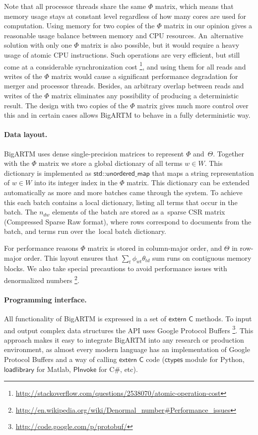 \documentclass[russian,english]{llncs}
\newcommand{\kw}[1]{\textsf{#1}}
\begin{document}
Note that all processor threads share the same $\Phi$ matrix,
which means that memory usage stays at constant level regardless of how many cores are used for computation.
Using memory for two copies of the $\Phi$ matrix in our opinion gives a reasonable usage balance between memory and CPU resources.
An~alternative solution with only one $\Phi$ matrix is also possible, but it would require a heavy usage of atomic CPU instructions.
Such operations are very efficient, but still come at a considerable synchronization cost%
\footnote{\url{http://stackoverflow.com/questions/2538070/atomic-operation-cost}},
and using them for all reads and writes of the $\Phi$ matrix would cause a significant performance degradation for merger and processor threads.
Besides, an arbitrary overlap between reads and writes of the $\Phi$ matrix eliminates any possibility of producing a deterministic result.
The design with two copies of the $\Phi$ matrix gives much more control over this
and in certain cases allows BigARTM to behave in a fully deterministic way.

\paragraph{Data layout.}
BigARTM uses dense single-precision matrices to represent $\Phi$ and~$\Theta$.
Together with the $\Phi$ matrix we store a global dictionary of all terms ${w \in W}$.
This dictionary is implemented as $\kw{std::unordered\_map}$ that maps a string representation of ${w \in W}$
into its integer index in the $\Phi$ matrix.
This dictionary can be extended automatically as more and more batches came through the system.
To achieve this each batch contains a local dictionary, listing all terms that occur in the batch.
The $n_{dw}$ elements of the batch are stored as a~sparse CSR matrix (Compressed Sparse Raw format),
where rows correspond to documents from the batch, and terms run over the~local batch dictionary.

For performance reasons $\Phi$ matrix is stored in column-major order, and $\Theta$ in row-major order.
This layout ensures that $\sum_t \phi_{wt} \theta_{td}$ sum runs on contiguous memory blocks.
We also take special precautions to avoid performance issues with denormalized numbers%
\footnote{\url{http://en.wikipedia.org/wiki/Denormal_number#Performance_issues}}.

\paragraph{Programming interface.}
All functionality of BigARTM is expressed in a set of $\kw{extern C}$ methods.
To input and output complex data structures the API uses Google Protocol Buffers%
\footnote{\url{http://code.google.com/p/protobuf/}}.
This approach makes it easy to integrate BigARTM into any research or production environment,
as almost every modern language has an implementation of Google Protocol Buffers
and a way of calling $\kw{extern C}$ code
($\kw{ctypes}$ module for Python, $\kw{loadlibrary}$ for Matlab, $\kw{PInvoke}$ for C\#, etc).
\end{document}
